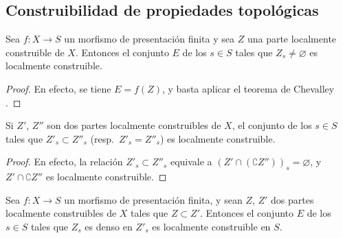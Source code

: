 \subsection{Construibilidad de propiedades topológicas}
\label{subsection:IV.9.5}

\begin{proposition}[9.5.1]
\label{IV.9.5.1}
Sea $f:X\to S$ un morfismo de presentación finita y sea $Z$ una parte localmente construible de $X$.
Entonces el conjunto $E$ de los $s\in S$ tales que $Z_s\neq\varnothing$ es localmente construible.
\end{proposition}

\begin{proof}
En efecto, se tiene $E=f(Z)$, y basta aplicar el teorema de Chevalley .
\end{proof}

\begin{corollary}[9.5.2]
\label{IV.9.5.2}
Si $Z'$, $Z''$ son dos partes localmente construibles de $X$, el conjunto de los $s\in S$ tales que $Z'_s\subset Z''_s$ \textnormal{(resp.}\ $Z'_s=Z''_s$\textnormal{)} es localmente construible.
\end{corollary}

\begin{proof}
En efecto, la relación $Z'_s\subset Z''_s$ equivale a $(Z'\cap(\complement Z''))_s=\varnothing$, y $Z'\cap\complement Z''$ es localmente construible.
\end{proof}

\begin{proposition}[9.5.3]
\label{IV.9.5.3}
Sea $f:X\to S$ un morfismo de presentación finita, y sean $Z$, $Z'$ dos partes localmente construibles de $X$ tales que $Z\subset Z'$.
Entonces el conjunto $E$ de los $s\in S$ tales que $Z_s$ es denso en $Z'_s$ es localmente construible en $S$.
\end{proposition}

